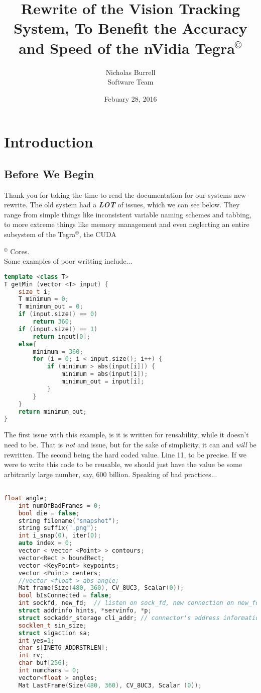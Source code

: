 \documentclass[11pt]{article}
\title{Rewrite of the Vision Tracking System, To Benefit the Accuracy and Speed of the nVidia Tegra$^{©}$}
\date{Febuary 28, 2016}
\author{Nicholas Burrell\\ Software Team}
\begin{document}
\lstset{style=code}
\pagecolor{oldpaper}
\afterpage{\nopagecolor}
\maketitle
\clearpage

\section{Introduction}
\subsection{Before We Begin}
Thank you for taking the time to read the documentation for our systems new rewrite. The old system had a \textit{\textbf{LOT}} of issues, which we can see below. They range from simple things like inconsistent variable naming schemes and tabbing, to more extreme things like memory management and even neglecting an entire subsystem of the Tegra$^{©}$, the CUDA{$^{©}$ Cores.\\
Some examples of poor writting include...
\begin{lstlisting}[language=C++, caption=Poor Coding Part 1]
template <class T>
T getMin (vector <T> input) {
	size_t i;
	T minimum = 0;
	T minimum_out = 0;
	if (input.size() == 0)
		return 360;
	if (input.size() == 1)
		return input[0];
	else{
		minimum = 360;
		for (i = 0; i < input.size(); i++) {
			if (minimum > abs(input[i])) {
				minimum = abs(input[i]);
				minimum_out = input[i];
			}
		}
	}
	return minimum_out;
}
\end{lstlisting}
The first issue with this example, is it is written for reusability, while it doesn't need to be. That is \textit{not} and issue, but for the sake of simplicity, it can and \textit{will} be rewritten. The second being the hard coded value. Line 11, to be precise. If we were to write this code to be reusable, we should just have the value be some arbitrarily large number, say, 600 billion. Speaking of bad practices...\\
\clearpage
\begin{lstlisting}[language=C++, caption=Poor Coding Part 2]

float angle;
	int numOfBadFrames = 0;
    bool die = false;
	string filename("snapshot");
	string suffix(".png");
	int i_snap(0), iter(0);
	auto index = 0;
    vector < vector <Point> > contours;
    vector<Rect > boundRect;
	vector <KeyPoint> keypoints;
	vector <Point> centers;
	//vector <float > abs_angle;
	Mat frame(Size(480, 360), CV_8UC3, Scalar(0));
	bool bIsConnected = false;
	int sockfd, new_fd;  // listen on sock_fd, new connection on new_fd
	struct addrinfo hints, *servinfo, *p;
	struct sockaddr_storage cli_addr; // connector's address information
	socklen_t sin_size;
	struct sigaction sa;
	int yes=1;
	char s[INET6_ADDRSTRLEN];
	int rv;
	char buf[256];
	int numchars = 0;
	vector<float > angles;
	Mat LastFrame(Size(480, 360), CV_8UC3, Scalar (0));


\end{lstlisting}}
\end{document}
